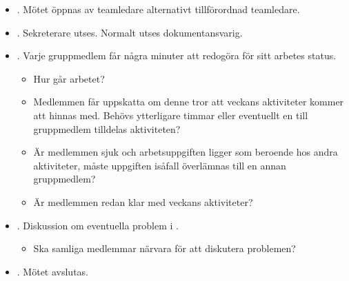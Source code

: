 \documentclass[titlepage, a4paper]{article}
\begin{document}
 
\begin{itemize}
\item{. Mötet öppnas av teamledare alternativt tillförordnad teamledare.}
\item{. Sekreterare utses. Normalt utses dokumentansvarig.}
\item{. Varje gruppmedlem får några minuter att redogöra för sitt arbetes status.
  \begin{itemize}
  \item{Hur går arbetet?}
  \item{Medlemmen får uppskatta om denne tror att veckans aktiviteter kommer att hinnas med. Behövs ytterligare timmar eller eventuellt en till gruppmedlem tilldelas aktiviteten?}
  \item{Är medlemmen sjuk och arbetsuppgiften ligger som beroende hos andra aktiviteter, måste uppgiften isåfall överlämnas till en annan gruppmedlem?}
  \item{Är medlemmen redan klar med veckans aktiviteter?}
  \end{itemize}
}

\item{. Diskussion om eventuella problem i .
  \begin{itemize}
  \item{Ska samliga medlemmar närvara för att diskutera problemen?}
  \end{itemize}
}

\item{. Mötet avslutas.}
\end{itemize}
\end{document}
